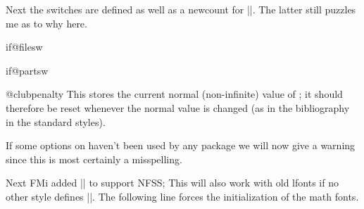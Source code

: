 Next the switches are defined as well as a newcount for |\@clubpenalty|.
The latter still puzzles me as to why here.

 \begin{docCommand}{if@filesw}{}
 \begin{docCommand}{if@partsw}{}
 \end{docCommand}
 \end{docCommand}
    \begin{teX}
\newif\if@filesw \@fileswtrue
\newif\if@partsw \@partswfalse
    \end{teX}

 \begin{docCommand}{@clubpenalty}{}
    This stores the current normal (non-infinite) value of
    ; it should therefore be reset whenever the
    normal value is changed (as in the bibliography in the standard
    styles).
  \end{docCommand}
    \begin{teX}
\newcount\@clubpenalty
\@clubpenalty \clubpenalty
    \end{teX}


  \begin{teX}
    \def\document{\endgroup
   \end{teX}

    If some options on  haven't been used by any
    package we will now give a warning since this is most certainly a
    misspelling.



Next 
 FMi added |\process@table| to support NFSS;
 This will also work with old lfonts if no other style defines
 |\process@table|.  The following line forces the initialization of
 the math fonts.
 \begin{teX}
  \process@table
  \let\glb@currsize\@empty  %
  \normalsize
  \everypar{}%
 \end{teX}
%

